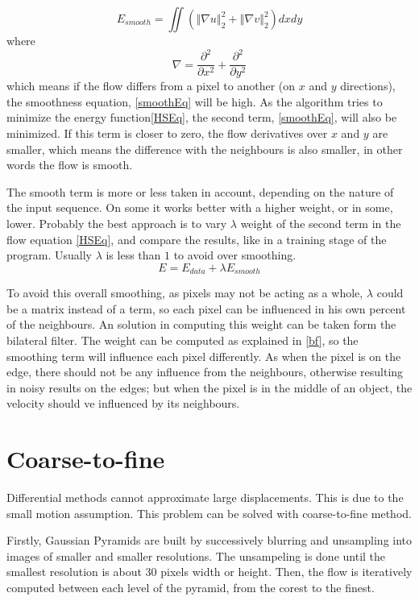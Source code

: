 \documentclass[12pt,a4paper,twoside]{report}
\begin{document}
\begin{equation} \label{smoothEq}
	E_{smooth} = \iint (\left\Vert\nabla u \right\Vert_2^2 +\left\Vert\nabla v \right\Vert_2^2)dxdy
\end{equation}
where
\begin{equation}
	\nabla = \frac{\partial^2}{\partial x^2} + \frac{\partial^2}{\partial y^2}
\end{equation}
which means if the flow differs from a pixel to another (on $x$ and $y$ directions), the smoothness equation, \ref{smoothEq} will be high. As the algorithm tries to minimize the energy function\ref{HSEq}, the second term, \ref{smoothEq}, will also be minimized. If this term is closer to zero, the flow derivatives over $x$ and $y$  are smaller, which means the difference with the  neighbours is also smaller, in other words the flow is smooth.

The smooth term is more or less taken in account, depending on the nature of the input sequence. On some it works better with a higher weight, or in some, lower. Probably the best approach is to vary $\lambda$ weight of the second term in the flow equation \ref{HSEq}, and compare the results, like in a training stage of the program. Usually $\lambda$ is less than $1$ to avoid over smoothing.
\begin{equation}
	E = E_{data}+\lambda E_{smooth}
\end{equation}

To avoid this overall smoothing, as pixels may not be acting as a whole, $\lambda$ could be a matrix instead of a term, so each pixel can be influenced in his own percent of the neighbours.
An solution in computing this weight can be taken form the bilateral filter. The weight can be computed as explained in
\ref{bf}, so the smoothing term will influence each pixel differently. As when the pixel is on the edge, there should not be any influence from the neighbours, otherwise resulting in noisy results on the edges; but when the pixel is in the middle of an object, the velocity should ve influenced by its neighbours.

\section{Coarse-to-fine}
Differential methods cannot approximate large displacements. This is due to the small motion assumption. This problem can be solved with coarse-to-fine method.


 
Firstly, Gaussian Pyramids are built by successively blurring and unsampling into images of smaller and smaller resolutions. The unsampeling is done until the smallest resolution is about 30 pixels width or height.  Then, the flow is iteratively computed between each level of the pyramid, from the corest to the finest.
\end{document}
